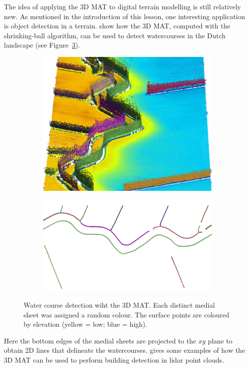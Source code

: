 The idea of applying the 3D MAT to digital terrain modelling is still relatively new.
As mentioned in the introduction of this lesson, one interesting application is object detection in a terrain.
\citet{Broersen17} show how the 3D MAT, computed with the shrinking-ball algorithm, can be used to detect watercourses in the Dutch landscape (see Figure~\ref{fig:MATsegmentation}). 
\begin{figure}
	\centering
	\begin{subfigure}{0.5\linewidth}
		\centering
		\includegraphics[width=\textwidth]{figs/3dmat.png}
		\label{fig:MATmeth}
	\end{subfigure}%
	\qquad
	\begin{subfigure}{0.4\linewidth}
		\centering
		\includegraphics[width=\textwidth,angle=90]{figs/3dmat_plan.png}
		\label{fig:MAT_out_seg_filt}
	\end{subfigure}%
	\caption[MATsegmentation]{Water course detection wiht the 3D MAT. Each distinct medial sheet was assigned a random colour. The surface points are coloured by elevation (yellow = low; blue = high).}
	\label{fig:MATsegmentation}
\end{figure}
Here the bottom edges of the medial sheets are projected to the $xy$ plane to obtain 2D lines that delineate the watercourses.
\citet{Peters18} gives some examples of how the 3D MAT can be used to perform building detection in lidar point clouds.

